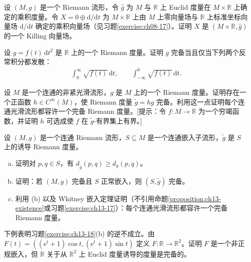 \documentclass[../../main.tex]{subfiles}
\begin{document}
\begin{exercise}\label{exercise:ch13-15}
设 $(M,g)$ 是一个 Riemann 流形，令 $\hat g$ 为 $M$ 与 $\mathbb{R}$ 上 Euclid 度量在 $M\times\mathbb{R}$ 上确定的乘积度量。令 $X=0\oplus\mathrm{d}/\mathrm{d}t$ 为 $M\times\mathbb{R}$ 上由 $M$ 上零向量场与 $\mathbb{R}$ 上标准坐标向量场 $\mathrm{d}/\mathrm{d}t$ 确定的乘积向量场（见习题\ref{exercise:ch08-17}）。证明 $X$ 是 $(M\times\mathbb{R},\hat g)$ 的一个 Killing 向量场。
\end{exercise}

\begin{exercise}\label{exercise:ch13-16}
设 $g=f(t)\,\mathrm{d}t^2$ 是 $\mathbb{R}$ 上的一个 Riemann 度量。证明 $g$ 完备当且仅当下列两个反常积分都发散：
\begin{align*}
\int_0^\infty \sqrt{f(t)}\,\mathrm{d}t,\qquad
\int_{-\infty}^0 \sqrt{f(t)}\,\mathrm{d}t.
\end{align*}
\end{exercise}

\begin{exercise}\label{exercise:ch13-17}
设 $M$ 是一个连通的非紧光滑流形，$g$ 是 $M$ 上的一个 Riemann 度量。证明存在一个正函数 $h\in C^\infty(M)$，使 Riemann 度量 $\widetilde g=hg$ 完备。利用这一点证明每个连通光滑流形都容许一个完备 Riemann 度量。[提示：令 $f:M\to\mathbb{R}$ 为一个穷竭函数，并证明 $h$ 可选成使 $f$ 在 $\widetilde g$-有界集上有界。]
\end{exercise}

\begin{exercise}\label{exercise:ch13-18}
设 $(M,g)$ 是一个连通 Riemann 流形，$S\subseteq M$ 是一个连通嵌入子流形，$\widetilde g$ 是 $S$ 上的诱导 Riemann 度量。
\begin{enumerate}[(a)]
\item 证明对 $p,q\in S$，有 $d_{\widetilde g}(p,q)\geqslant d_g(p,q)$。
\item 证明：若 $(M,g)$ 完备且 $S$ 正常嵌入，则 $(S,\widetilde g)$ 完备。
\item 利用 (b) 以及 Whitney 嵌入定理证明（不引用命题\ref{proposition:ch13-existence}或习题\ref{exercise:ch13-17}）：每个连通光滑流形都容许一个完备 Riemann 度量。
\end{enumerate}
\end{exercise}

\begin{exercise}\label{exercise:ch13-19}
下例表明习题\ref{exercise:ch13-18}(b) 的逆不成立。由 $F(t)=((\mathrm{e}^t+1)\cos t,(\mathrm{e}^t+1)\sin t)$ 定义 $F:\mathbb{R}\to\mathbb{R}^2$。证明 $F$ 是一个非正规嵌入，但 $\mathbb{R}$ 关于从 $\mathbb{R}^2$ 上 Euclid 度量诱导的度量是完备的。
\end{exercise}
\end{document}
